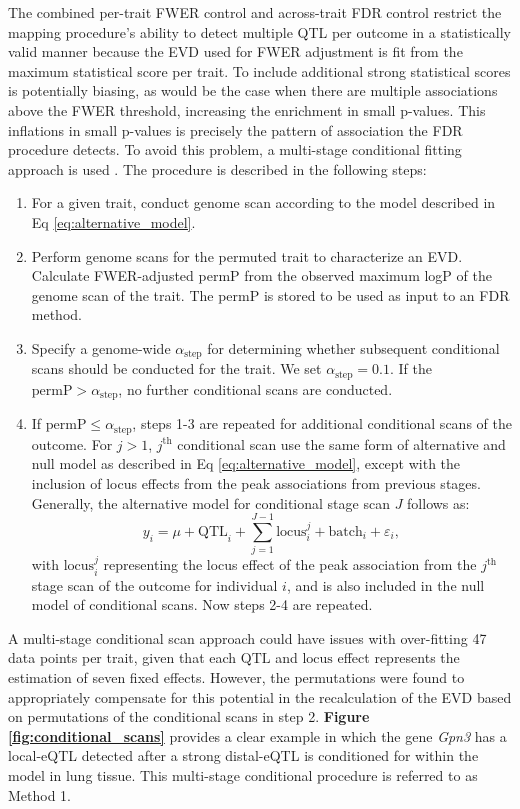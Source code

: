 \documentclass[9pt,twocolumn,twoside]{gsajnl}
\begin{document}
The combined per-trait FWER control and across-trait FDR control restrict the mapping procedure’s ability to detect multiple QTL per outcome in a statistically valid manner because the EVD used for FWER adjustment is fit from the maximum statistical score per trait. To include additional strong statistical scores is potentially biasing, as would be the case when there are multiple associations above the FWER threshold, increasing the enrichment in small p-values. This inflations in small p-values is precisely the pattern of association the FDR procedure detects. To avoid this problem, a multi-stage conditional fitting approach is used \citep{Jansen2017}. The procedure is described in the following steps:
\begin{enumerate}
	\item For a given trait, conduct genome scan according to the model described in Eq \ref{eq:alternative_model}.
    \item Perform genome scans for the permuted trait to characterize an EVD. Calculate FWER-adjusted permP from the observed maximum logP of the genome scan of the trait. The permP is stored to be used as input to an FDR method.
    \item Specify a genome-wide $\alpha_{\text{step}}$ for determining whether subsequent conditional scans should be conducted for the trait. We set $\alpha_{\text{step}} = 0.1$. If the $\text{permP} > \alpha_{\text{step}}$, no further conditional scans are conducted.
    \item If $\text{permP} \le \alpha_{\text{step}}$, steps 1-3 are repeated for additional conditional scans of the outcome. For $j > 1$, $j^{\text{th}}$ conditional scan use the same form of alternative and null model as described in Eq \ref{eq:alternative_model}, except with the inclusion of locus effects from the peak associations from previous stages. Generally, the alternative model for conditional stage scan $J$ follows as:
\begin{equation}
y_{i} = \mu + \text{QTL}_{i} + \sum_{j=1}^{J-1}\text{locus}_{i}^{j} + \text{batch}_{i} + \varepsilon_{i},
\label{eq:conditional_model}
\end{equation}
with $\text{locus}_{i}^{j}$ representing the locus effect of the peak association from the $j^{\text{th}}$ stage scan of the outcome for individual $i$, and is also included in the null model of conditional scans. Now steps 2-4 are repeated.
\end{enumerate}

A multi-stage conditional scan approach could have issues with over-fitting 47 data points per trait, given that each $\text{QTL}$ and $\text{locus}$ effect represents the estimation of seven fixed effects. However, the permutations were found to appropriately compensate for this potential in the recalculation of the EVD based on permutations of the conditional scans in step 2. \textbf{Figure \ref{fig:conditional_scans}} provides a clear example in which the gene \textit{Gpn3} has a local-eQTL detected after a strong distal-eQTL is conditioned for within the model in lung tissue. This multi-stage conditional procedure is referred to as Method 1.
\end{document}
